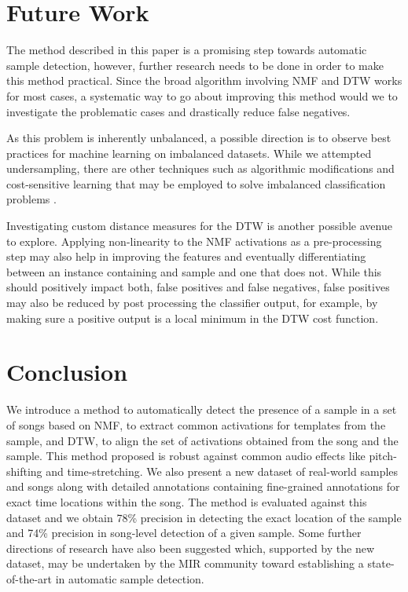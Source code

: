 \documentclass{article}
\begin{document}
\section{Future Work}

The method described in this paper is a promising step towards automatic sample detection, however, further research needs to be done in order to make this method practical. Since the broad algorithm involving NMF and DTW works for most cases, a systematic way to go about improving this method would we to investigate the problematic cases and drastically reduce false negatives.

As this problem is inherently unbalanced, a possible direction is to observe best practices for machine learning on imbalanced datasets. While we attempted undersampling, there are other techniques such as algorithmic modifications and cost-sensitive learning that may be employed to solve imbalanced classification problems \cite{lopez2013insight}.

Investigating custom distance measures for the DTW is another possible avenue to explore. Applying non-linearity to the NMF activations as a pre-processing step may also help in improving the features and eventually differentiating between an instance containing and sample and one that does not. While this should positively impact both, false positives and false negatives, false positives may also be reduced by post processing the classifier output, for example, by making sure a positive output is a local minimum in the DTW cost function.

\section{Conclusion}


We introduce a method to automatically detect the presence of a sample in a set of songs based on NMF, to extract common activations for templates from the sample, and DTW, to align the set of activations obtained from the song and the sample. This method proposed is robust against common audio effects like pitch-shifting and time-stretching. We also present a new dataset of real-world samples and songs along with detailed annotations containing fine-grained annotations for exact time locations within the song. The method is evaluated against this dataset and we obtain 78\% precision in detecting the exact location of the sample and 74\% precision in song-level detection of a given sample. Some further directions of research have also been suggested which, supported by the new dataset, may be undertaken by the MIR community toward establishing a state-of-the-art in automatic sample detection.
\newpage

\end{document}
